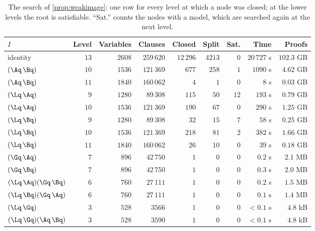 \begin{table}[t]
\centering\small
\caption{The search of \cref{prop:weakimage}: one row for every level at which
a node was closed; at the lower levels the root is satisfiable. ``Sat.''
counts the nodes with a model, which are searched again at the next level.}
\label{tab:weakimage}
\begin{tabular}{@{}lrrrrrrrr@{}}
\toprule
$I$ & Level & Variables & Clauses & Closed & Split & Sat. & Time & Proofs\\
\midrule
identity & $13$ & $2608$ & $259\,620$ & $12\,296$ & $4213$ & $0$ & $20\,727$ s & $102.3$ GB\\
$(\Aq\,\Bq)$ & $10$ & $1536$ & $121\,369$ & $677$ & $258$ & $1$ & $1090$ s & $4.62$ GB\\
$(\Aq\,\Bq)$ & $11$ & $1840$ & $160\,062$ & $4$ & $1$ & $0$ & $8$ s & $0.03$ GB\\
$(\Lq\,\Aq)$ & $9$ & $1280$ & $89\,308$ & $115$ & $50$ & $12$ & $193$ s & $0.79$ GB\\
$(\Lq\,\Aq)$ & $10$ & $1536$ & $121\,369$ & $190$ & $67$ & $0$ & $290$ s & $1.25$ GB\\
$(\Lq\,\Bq)$ & $9$ & $1280$ & $89\,308$ & $32$ & $15$ & $7$ & $58$ s & $0.25$ GB\\
$(\Lq\,\Bq)$ & $10$ & $1536$ & $121\,369$ & $218$ & $81$ & $2$ & $382$ s & $1.66$ GB\\
$(\Lq\,\Bq)$ & $11$ & $1840$ & $160\,062$ & $26$ & $10$ & $0$ & $39$ s & $0.18$ GB\\
$(\Gq\,\Aq)$ & $7$ & $896$ & $42\,750$ & $1$ & $0$ & $0$ & $0.2$ s & $2.1$ MB\\
$(\Gq\,\Bq)$ & $7$ & $896$ & $42\,750$ & $1$ & $0$ & $0$ & $0.3$ s & $2.0$ MB\\
$(\Lq\,\Aq)(\Gq\,\Bq)$ & $6$ & $760$ & $27\,111$ & $1$ & $0$ & $0$ & $0.2$ s & $1.5$ MB\\
$(\Lq\,\Bq)(\Gq\,\Aq)$ & $6$ & $760$ & $27\,111$ & $1$ & $0$ & $0$ & $0.1$ s & $1.4$ MB\\
$(\Lq\,\Gq)$ & $3$ & $528$ & $3566$ & $1$ & $0$ & $0$ & $<0.1$ s & $4.8$ kB\\
$(\Lq\,\Gq)(\Aq\,\Bq)$ & $3$ & $528$ & $3590$ & $1$ & $0$ & $0$ & $<0.1$ s & $4.8$ kB\\
\bottomrule
\end{tabular}
\end{table}

